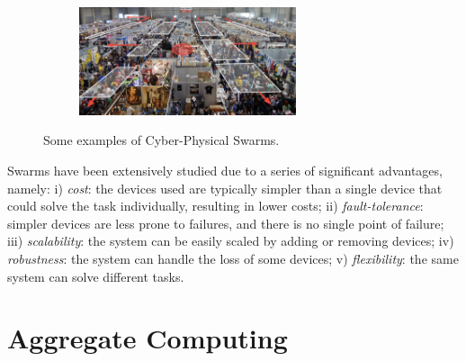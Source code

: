 \documentclass[12pt,a4paper,openright,twoside]{book}
\begin{document}
\begin{figure}[t]
\begin{subfigure}[b]{0.49\textwidth}
        \centering
        \includegraphics[width=0.7\textwidth]{figures/crowd.png}
    \end{subfigure}
    \caption{Some examples of Cyber-Physical Swarms.}%
    \label{fig:cpsw}
\end{figure}


Swarms have been extensively studied due to a series of significant advantages, namely:
    i) \emph{cost}: the devices used are typically simpler than a single device that could solve the task individually, resulting in lower costs;
    ii) \emph{fault-tolerance}: simpler devices are less prone to failures, and there is no single point of failure;
    iii) \emph{scalability}: the system can be easily scaled by adding or removing devices;
    iv) \emph{robustness}: the system can handle the loss of some devices;
    v) \emph{flexibility}: the same system can solve different tasks.


%
\section{Aggregate Computing}
\end{document}
